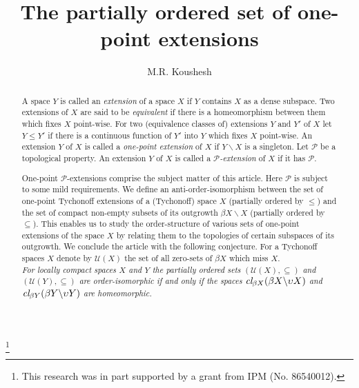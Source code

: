 \documentclass{amsart}
\theoremstyle{definition}
\theoremstyle{remark}
\theoremstyle{notation}
\numberwithin{equation}{section}
\begin{document}
\title[The partially ordered set of one-point extensions]{The partially ordered set of one-point extensions}

\author{M.R. Koushesh}
\address{Department of Mathematical Sciences, Isfahan University of Technology, Isfahan 84156--83111, Iran}
\address{School of Mathematics, Institute for Research in Fundamental Sciences (IPM), P.O. Box: 19395--5746, Tehran, Iran}
\thanks{This research was in part supported by a grant from IPM (No. 86540012).}



\begin{abstract}
A space $Y$ is called an {\em extension} of a space $X$ if $Y$
contains $X$ as a dense subspace.
Two extensions of $X$ are said to be {\em equivalent} if there is a homeomorphism between them which fixes $X$ point-wise.
For two (equivalence classes of)  extensions $Y$ and $Y'$ of $X$ let $Y\leq Y'$ if there is a continuous function of $Y'$ into $Y$
which fixes  $X$ point-wise.
An extension $Y$ of  $X$ is called a {\em one-point extension} of $X$ if $Y\backslash X$ is a singleton. Let ${\mathcal P}$ be a topological
property. An extension $Y$ of $X$ is called a {\em
${\mathcal P}$-extension} of $X$ if it has ${\mathcal P}$.

One-point ${\mathcal P}$-extensions comprise the subject matter of this article. Here ${\mathcal P}$
is subject to some mild requirements. We define an anti-order-isomorphism between the set of one-point Tychonoff extensions of a (Tychonoff) space $X$ (partially ordered by $\leq$) and the set of compact non-empty subsets of its outgrowth $\beta X\backslash X$ (partially ordered by $\subseteq$). This enables us to study the order-structure of  various sets of one-point extensions of the space $X$ by relating them to the  topologies of certain subspaces of its outgrowth. We conclude the article with the following conjecture. For a Tychonoff spaces $X$ denote by ${\mathscr U}(X)$ the set of all zero-sets of $\beta X$ which miss $X$.\\

 {\em For locally compact spaces $X$ and $Y$ the partially ordered sets $({\mathscr U}(X),\subseteq)$ and $({\mathscr U}(Y),\subseteq)$ are order-isomorphic if and only if the spaces $\mbox{\em cl}_{\beta X}(\beta X\backslash\upsilon X)$ and $\mbox{\em cl}_{\beta Y}(\beta Y\backslash\upsilon Y)$ are homeomorphic.}
\end{abstract}
\end{document}
